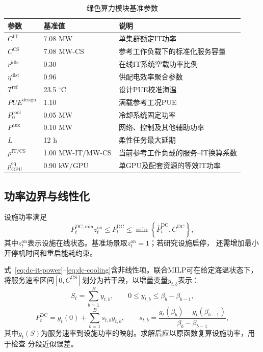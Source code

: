 \begin{table}[H]
\centering
\caption{绿色算力模块基准参数}
\label{tab:compute-parameters}
\begin{tabularx}{\textwidth}{p{2.3cm}p{4.4cm}X}
\toprule
参数 & 基准值 & 说明 \\
\midrule
$C^{\mathrm{IT}}$ & 7.08 MW & 单集群额定IT功率 \\
$C^{\mathrm{CS}}$ & 7.08 MW-CS & 参考工作负载下的标准化服务容量 \\
$r^{\mathrm{idle}}$ & 0.30 & 在线IT系统空载功率比例 \\
$\eta^{\mathrm{dist}}$ & 0.96 & 供配电效率聚合参数 \\
$T^{\mathrm{ref}}$ & 23.5 $^\circ$C & 设计PUE校准海温 \\
$PUE^{\mathrm{design}}$ & 1.10 & 满载参考工况PUE \\
$P_0^{\mathrm{cool}}$ & 0.05 MW & 冷却系统固定功率 \\
$P^{\mathrm{aux}}$ & 0.10 MW & 网络、控制及其他辅助功率 \\
$L$ & 12 h & 柔性任务最大延期 \\
$\rho^{\mathrm{IT/CS}}$ & 1.00 MW-IT/MW-CS & 当前参考工作负载的服务--IT换算系数 \\
$p_{\mathrm{GPU}}^{\mathrm{eq}}$ & 0.90 kW/GPU & 单GPU及配套资源的等效IT功率 \\
\bottomrule
\end{tabularx}
\end{table}

\subsection{功率边界与线性化}

设施功率满足
\begin{equation}
P_t^{\mathrm{DC,min}}z_t^{\mathrm{on}}
\le P_t^{\mathrm{DC}}
\le \min\left\{\overline P_t^{\mathrm{DC}},C^{\mathrm{DC}}\right\},
\label{eq:dc-power-cap}
\end{equation}
其中$z_t^{\mathrm{on}}$表示设施在线状态。基准场景取$z_t^{\mathrm{on}}=1$；若研究设施启停，
还需增加最小开停机时间和重启能耗约束。

式~\eqref{eq:dc-it-power}--\eqref{eq:dc-cooling}含非线性项。联合MILP可在给定海温状态下，
将服务速率区间$[0,C^{\mathrm{CS}}]$划分为若干段，以增量变量$y_{t,b}$表示：
\begin{equation}
S_t=\sum_{b=1}^{B}y_{t,b},
\qquad 0\le y_{t,b}\le \beta_b-\beta_{b-1},
\end{equation}
\begin{equation}
P_t^{\mathrm{DC}}
=g_t(0)+\sum_{b=1}^{B}s_{t,b}y_{t,b},
\qquad
s_{t,b}=\frac{g_t(\beta_b)-g_t(\beta_{b-1})}
{\beta_b-\beta_{b-1}},
\label{eq:dc-piecewise}
\end{equation}
其中$g_t(S)$为服务速率到设施功率的映射。求解后应以原函数复算设施功率，用于检查
分段近似误差。

